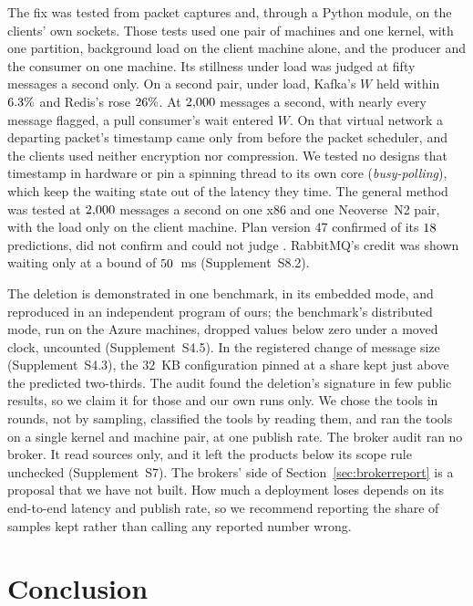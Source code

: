 \documentclass[10pt,journal,compsoc]{IEEEtran}
\newcommand{\kafka}{Kafka}
\newcommand{\redis}{Redis}
\begin{document}
The fix was tested from packet captures and, through a Python module, on the clients' own sockets.
Those tests used one pair of machines and one kernel, with one partition, background load on the
client machine alone, and the producer and the consumer on one machine. Its stillness under load
was judged at fifty messages a second only. On a second pair, under load, \kafka{}'s $W$ held
within $6.3\%$ and \redis{}'s rose $26\%$. At $2{,}000$
messages a second, with nearly every message flagged, a pull
consumer's wait entered $W$. On that virtual network a departing packet's timestamp came only from
before the packet scheduler, and the clients used neither encryption nor compression. We tested no
designs that timestamp in hardware or pin a spinning thread to its own core
(\emph{busy-polling}), which keep the waiting state out of the latency they time. The general method was tested at $2{,}000$ messages a
second on one x86 and one Neoverse~N2 pair, with the load only on the client machine. Plan version 47
confirmed \gmFirstConfirmedWord{} of its $18$ predictions, did not confirm
\gmFirstNotConfirmedWord{} and could not judge \gmFirstNotJudgedWord{}. RabbitMQ's credit was shown waiting
only at a bound of $50$~ms (Supplement~S8.2).

The deletion is demonstrated in one benchmark, in its embedded mode, and reproduced in an
independent program of ours; the benchmark's distributed mode, run on the Azure machines, dropped
values below zero under a moved clock, uncounted (Supplement~S4.5). In the registered change of
message size (Supplement~S4.3), the $32$~KB configuration pinned at a share kept just above the predicted two-thirds. The audit found the deletion's
signature in few public results, so we claim it for those and our own runs only. We chose the tools
in rounds, not by sampling, classified the \harnessAuditedWord{} tools by reading them, and ran the
\toolsRunWord{} tools on a single kernel and machine pair, at one publish rate. The broker audit ran no
broker. It read sources only, and it left the products below its scope rule unchecked
(Supplement~S7). The brokers' side of Section~\ref{sec:brokerreport} is a proposal that we have not
built. How much a deployment loses depends on its end-to-end latency and publish rate, so we
recommend reporting the share of samples kept rather than calling any reported number wrong.


\section{Conclusion}
\label{sec:conclusion}
\end{document}
